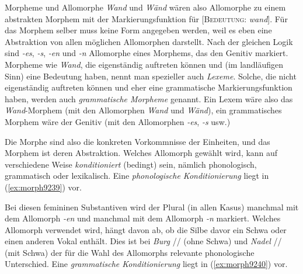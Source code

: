 \begin{Vertiefung}{Morpheme und Allomorphe}
\textit{Wand} und \textit{Wänd} wären also Allomorphe zu einem abstrakten Morphem mit der Markierungsfunktion für [\textsc{Bedeutung}: \textit{wand}].
Für das Morphem selber muss keine Form angegeben werden, weil es eben eine Abstraktion von allen möglichen Allomorphen darstellt.
Nach der gleichen Logik sind \textit{-es}, \textit{-s}, \textit{-en} und \textit{-n} Allomorphe eines Morphems, das den Genitiv markiert.
Morpheme wie \textit{Wand}, die eigenständig auftreten können und (im landläufigen Sinn) eine Bedeutung haben, nennt man spezieller auch \textit{Lexeme}.
Solche, die nicht eigenständig auftreten können und eher eine grammatische Markierungsfunktion haben, werden auch \textit{grammatische Morpheme} genannt.
Ein Lexem wäre also das \textit{Wand}-Morphem (mit den Allomorphen \textit{Wand} und \textit{Wänd}), ein grammatisches Morphem wäre der Genitiv (mit den Allomorphen \textit{-es}, \textit{-s} usw.)

Die Morphe sind also die konkreten Vorkommnisse der Einheiten, und das Morphem ist deren Abstraktion.
Welches Allomorph gewählt wird, kann auf verschiedene Weise \textit{konditioniert} (bedingt) sein, nämlich phonologisch, grammatisch oder lexikalisch.
Eine \textit{phonologische Konditionierung} liegt in (\ref{ex:morph9239}) vor.


\begin{exe}
  \ex{\label{ex:morph9239}}
  \begin{xlist}
  \end{xlist}
\end{exe}

Bei diesen femininen Substantiven wird der Plural (in allen Kasus) manchmal mit dem Allomorph \textit{-en} und manchmal mit dem Allomorph \textit{-n} markiert.
Welches Allomorph verwendet wird, hängt davon ab, ob die Silbe davor ein Schwa oder einen anderen Vokal enthält.
Dies ist bei \textit{Burg} // (ohne Schwa) und \textit{Nadel} // (mit Schwa) der für die Wahl des Allomorphs relevante phonologische Unterschied.
Eine \textit{grammatische Konditionierung} liegt in (\ref{ex:morph9240}) vor.

\begin{exe}
  \ex \label{ex:morph9240}
  \begin{xlist}
  \end{xlist}
\end{exe}


\end{Vertiefung}
